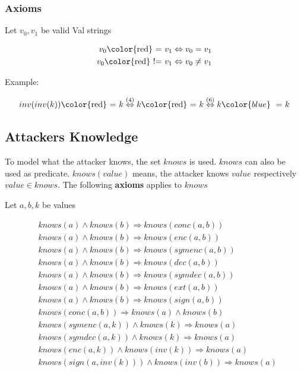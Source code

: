 \documentclass[12pt,journal,compsoc]{IEEEtran}
\newcommand{\knowsname}[0]{knows}
\newcommand{\knows}[1]{\knowsname (#1)}
\newcommand{\conc}[2]{conc(#1,#2)}
\newcommand{\enc}[2]{enc(#1,#2)}
\newcommand{\symenc}[2]{symenc(#1,#2)}
\newcommand{\dec}[2]{dec(#1,#2)}
\newcommand{\symdec}[2]{symdec(#1,#2)}
\newcommand{\ext}[2]{ext(#1,#2)}
\newcommand{\sign}[2]{sign(#1,#2)}
\newcommand{\inv}[1]{inv(#1)}
\newcommand{\linesep}[0]{\newline}
\begin{document}
\subsubsection{Axioms}

Let $v_0,v_1$ be valid Val strings 
\begin{small}
\begin{align}
	v_0 \text{\color{red}\  = } v_1 \Leftrightarrow v_0 = v_1 		\\
	v_0 \text{\color{red}\ != } v_1 \Leftrightarrow v_0 \not = v_1 	
\end{align}
\end{small}

Example:
\begin{small}
\begin{align*}
	\inv{\inv{k}} \text{\color{red}\ = } k \overset{(4)}{\Leftrightarrow} k \text{\color{red}\ = } k \overset{(6)}{\Leftrightarrow} k {\color{blue}\ =\ } k \\
\end{align*}
\end{small}

\subsection{Attackers Knowledge}

To model what the attacker knows, the set $\knowsname$ is used. $\knowsname$ 
can also be used as predicate. $\knows{value}$ means, the attacker
knows $value$ respectively $value \in \knowsname$. The following \textbf{axioms} applies to $\knowsname$
\linesep

Let $a,b,k$ be values
\begin{small}
\begin{align}
	 &\knows{a} \wedge \knows{b} 						\Rightarrow \knows{\conc{a}{b}}			\\
	 &\knows{a} \wedge \knows{b} 						\Rightarrow \knows{\enc{a}{b}}			\\
	 &\knows{a} \wedge \knows{b} 						\Rightarrow \knows{\symenc{a}{b}}		\\
	 &\knows{a} \wedge \knows{b} 						\Rightarrow \knows{\dec{a}{b}}			\\
	 &\knows{a} \wedge \knows{b} 						\Rightarrow \knows{\symdec{a}{b}}		\\
	 &\knows{a} \wedge \knows{b} 						\Rightarrow \knows{\ext{a}{b}}			\\
	 &\knows{a} \wedge \knows{b} 						\Rightarrow \knows{\sign{a}{b}}			\\
	 &\knows{\conc{a}{b}}								\Rightarrow \knows{a} \wedge \knows{b}	\\
	 &\knows{\symenc{a}{k}} \wedge \knows{k} 				\Rightarrow \knows{a}					\\
	 &\knows{\symdec{a}{k}} \wedge \knows{k} 				\Rightarrow \knows{a}					\\
	 &\knows{\enc{a}{k}} \wedge \knows{\inv{k}} 			\Rightarrow \knows{a}					\\
	 &\knows{\sign{a}{\inv{k}}} \wedge \knows{\inv{b}} 	\Rightarrow \knows{a}					
\end{align}
\end{small}
\end{document}
